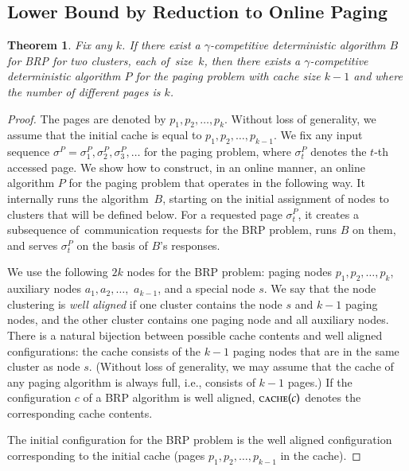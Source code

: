 \documentclass[11pt,a4paper]{scrartcl}
\newtheorem{theorem}{Theorem}
\begin{document}
\subsection{Lower Bound by Reduction to Online Paging}
\label{sec:paging}

\begin{theorem}
Fix any $k$. If there exist a $\gamma$-competitive deterministic algorithm $B$
for BRP for two clusters, each of~size~$k$, then there exists a
$\gamma$-competitive deterministic algorithm $P$ for the paging problem with 
cache size $k-1$ and where the number of different pages is $k$.
\end{theorem}

\begin{proof}
The pages are denoted by $p_1,p_2,\ldots,p_k$. Without loss of generality, we
assume that the initial cache is equal to $p_1,p_2,\ldots,p_{k-1}$. We fix any
input sequence $\sigma^P = \sigma^P_1, \sigma^P_2, \sigma^P_3, \ldots$ for the
paging problem, where $\sigma^P_t$ denotes the $t$-th accessed page. We show
how to construct, in an online manner, an online algorithm $P$ for the paging
problem that operates in the following way. It internally runs the algorithm~$B$, 
starting on the initial assignment of nodes to clusters that will be
defined below. For a requested page $\sigma^P_t$, it creates a subsequence
of~communication requests for the BRP problem, runs $B$ on them, and serves
$\sigma^P_t$ on the basis of $B$'s responses.

We use the following $2k$ nodes for the BRP problem: paging nodes $p_1,p_2,
\ldots, p_k$, auxiliary nodes $a_1,a_2,\ldots,$ $a_{k-1}$, and a special node
$s$. We say that the node clustering is \emph{well aligned} if one cluster
contains the node $s$ and $k-1$ paging nodes, and the other cluster contains
one paging node and all auxiliary nodes. There is a natural bijection between
possible cache contents and well aligned configurations: the cache consists of
the $k-1$ paging nodes that are in the same cluster as node $s$. (Without loss
of generality, we may assume that the cache of any paging algorithm is always
full, i.e., consists of $k-1$ pages.) If the configuration $c$ of a BRP
algorithm is well aligned, $\textsc{cache}(c)$ denotes the corresponding cache
contents.

The initial configuration for the BRP problem is the well aligned
configuration corresponding to the initial cache (pages
$p_1,p_2,\ldots,p_{k-1}$ in the cache).


\end{proof}
\end{document}
